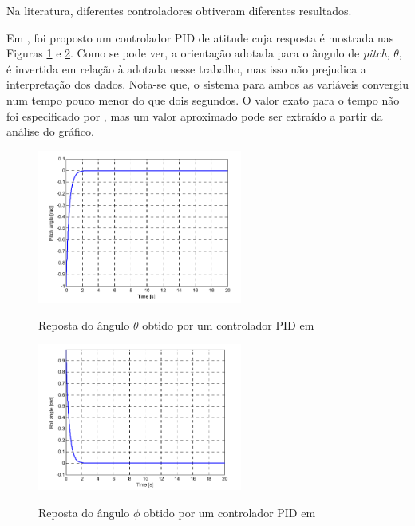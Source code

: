 Na literatura, diferentes controladores obtiveram diferentes resultados. 

Em \cite{Boubertakh2013}, foi proposto um controlador PID de atitude cuja resposta é mostrada nas Figuras \ref{fig:Boubertakh2013_pitch} e \ref{fig:Boubertakh2013_roll}. Como se pode ver, a orientação adotada para o ângulo de \textit{pitch}, $\theta$, é invertida em relação à adotada nesse trabalho, mas isso não prejudica a interpretação dos dados. Nota-se que, o sistema para ambos as variáveis convergiu num tempo pouco menor do que dois segundos. O valor exato para o tempo não foi especificado por , mas um valor aproximado pode ser extraído a partir da análise do gráfico.

\begin{figure}[!htb]
    \centering
    \caption{Reposta do ângulo $\theta$ obtido por um controlador PID em \cite{Boubertakh2013}}
    \includegraphics[width=0.6\textwidth]{./04-figuras/resultados/comparacao_outros/18_Boubertakh2013_pitch}
    \label{fig:Boubertakh2013_pitch}
\end{figure}
%
\begin{figure}[!htb]
    \centering
    \caption{Reposta do ângulo $\phi$ obtido por um controlador PID em \cite{Boubertakh2013}}
    \includegraphics[width=0.6\textwidth]{./04-figuras/resultados/comparacao_outros/18_Boubertakh2013_roll}
    \label{fig:Boubertakh2013_roll}
\end{figure}




